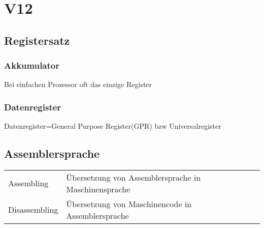 \section{V12}
\subsection{Registersatz}
\subsubsection{Akkumulator}
Bei einfachen Prozessor oft das einzige Register
\subsubsection{Datenregister}
Datenregister=General Purpose Register(GPR) bzw Universalregister
\subsection{Assemblersprache}
\begin{tabular}{ll}
    Assembling& Übersetzung von Assemblersprache in Maschinensprache \\  
    Disassembling& Übersetzung von Maschinencode in Assemblersprache \\ 
\end{tabular} 

